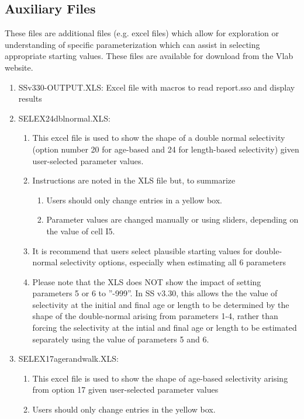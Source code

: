 	\subsection{Auxiliary Files}
	These files are additional files (e.g. excel files) which allow for exploration or understanding of specific parameterization which can assist in selecting appropriate starting values.  These files are available for download from the Vlab website. 
	\begin{enumerate}
		\item SSv330-OUTPUT.XLS:   Excel file with macros to read report.sso and display results
		\item SELEX24\textunderscore dbl\textunderscore normal.XLS:
		\begin{enumerate}
			\item This excel file is used to show the shape of a double normal selectivity (option number 20 for age-based and 24 for length-based selectivity) given user-selected parameter values.
			\item Instructions are noted in the XLS file but, to summarize
			\begin{enumerate}
				\item Users should only change entries in a yellow box. 
				\item Parameter values are changed manually or using sliders, depending on the value of cell I5.
			\end{enumerate}
			\item It is recommend that users select plausible starting values for double-normal selectivity options, especially when estimating all 6 parameters
			\item Please note that the XLS does NOT show the impact of setting parameters 5 or 6 to ''-999''.  In SS v3.30, this allows the the value of selectivity at the initial and final age or length to be determined by the shape of the double-normal arising from parameters 1-4, rather than forcing the selectivity at the intial and final age or length to be estimated separately using the value of parameters 5 and 6. 
		\end{enumerate}
		\item SELEX17\textunderscore age\textunderscore randwalk.XLS:
		\begin{enumerate}
			\item This excel file is used to show the shape of age-based selectivity arising from option 17 given user-selected parameter values
			\item Users should only change entries in the yellow box.

\end{enumerate}
\end{enumerate}
